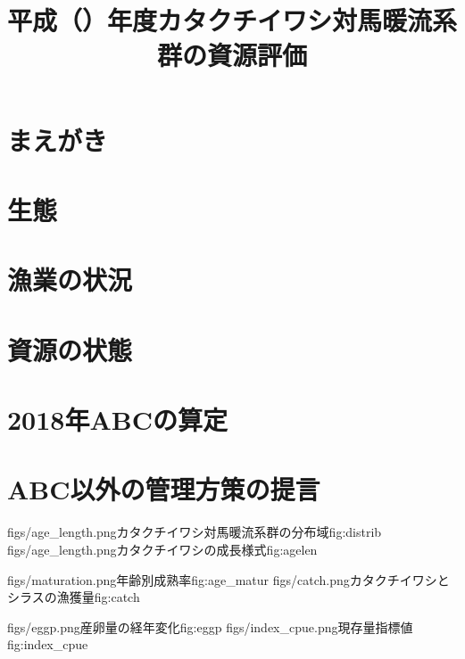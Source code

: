 \documentclass{jsarticle}
\title{平成\ThisYrJP（\ThisYr）年度カタクチイワシ対馬暖流系群の資源評価}
\author{}
\date{}
\newcommand{\ThisYr}{2018}
\begin{document}
\maketitle
\section{まえがき}
\section{生態}
\section{漁業の状況}
\section{資源の状態}
\section{\ThisYr 年ABCの算定}
\section{ABC以外の管理方策の提言}

\clearpage
\TwoFigs
{figs/age_length.png}{カタクチイワシ対馬暖流系群の分布域}{fig:distrib}
{figs/age_length.png}{カタクチイワシの成長様式}{fig:agelen}

\TwoFigs
{figs/maturation.png}{年齢別成熟率}{fig:age_matur}
{figs/catch.png}{カタクチイワシとシラスの漁獲量}{fig:catch}

\TwoFigs
{figs/eggp.png}{産卵量の経年変化}{fig:eggp}
{figs/index_cpue.png}{現存量指標値}{fig:index_cpue}
\end{document}
